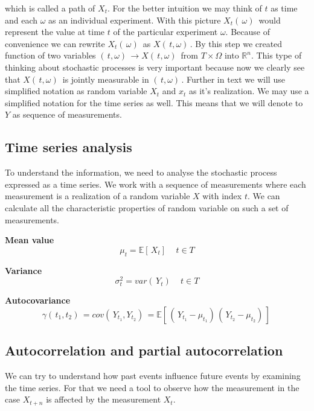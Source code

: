 \documentclass[thesis=M,english]{FITthesis}[2019/12/23]
\begin{document}
which is called a path of $X_t$.
For the better intuition we may think of $t$ as time and each $\omega$ as an individual experiment. With this picture $X_t( \,\omega) \,$ would represent the value at time $t$ of the particular experiment $\omega$. Because of convenience we can rewrite $X_t( \, \omega) \,$ as $X( \, t,\omega) \,$. By this step we created function of two variables $( \, t, \omega) \, \rightarrow X( \, t, \omega) \,$ from $T \times \Omega$ into $\mathbb{R}^n$. This type of thinking about stochastic processes is very important because now we clearly see that $X( \,t, \omega ) \,$ is jointly measurable in $( \,t, \omega) \,$. Further in text we will use simplified notation as random variable $X_t$ and $x_t$ as it's realization. We may use a simplified notation for the time series as well. This means that we will denote to $Y$ as sequence of measurements. 

\clearpage
\subsection{Time series analysis}
To understand the information, we need to analyse the stochastic process expressed as a time series. We work with a sequence of measurements where each measurement is a realization of a random variable $X$ with index $t$. We can calculate all the characteristic properties of random variable on such a set of measurements.


\textbf{Mean value}
\begin{equation*}
\mu_{t} = \mathbb{E}[ \,X_t ] \,\quad   t \in T
\end{equation*}

\textbf{Variance}
\begin{equation*}
\sigma_{t}^2 = var( \, Y_t )\,\quad t \in T
\end{equation*}

\textbf{Autocovariance}
\begin{equation*}
\gamma( \, t_1, t_2 ) \,  = cov(\, Y_{t_1}, Y_{t_2})\, = \mathbb{E}[ \, ( \, Y_{t_1} - \mu_{t_1} ) \, (\, Y_{t_2} - \mu_{t_2}  )\, ] \,
\end{equation*}

\subsection{Autocorrelation and partial autocorrelation}
We can try to understand how past events influence future events by examining the time series. For that we need a tool to observe how the measurement in the case $X_{t+n}$ is affected by the measurement $X_{t}$.
\end{document}
